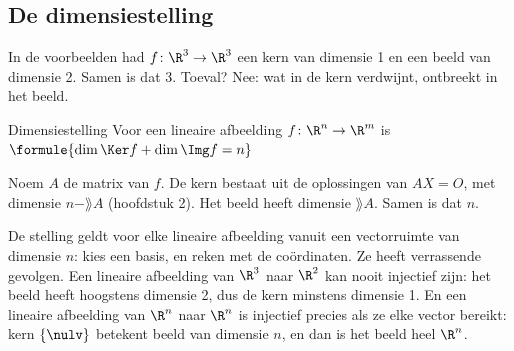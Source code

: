 
\begin{oefeningen}
\end{oefeningen}

\subsection{De dimensiestelling}

In de voorbeelden had $f \colon \R^3 \to \R^3$ een kern van dimensie 1 en een beeld van dimensie 2. Samen is dat 3. Toeval? Nee: wat in de kern verdwijnt, ontbreekt in het beeld.

\begin{theorie}
\begin{stelling}{Dimensiestelling}
Voor een lineaire afbeelding $f \colon \R^n \to \R^m$ is \quad $\formule{\dim \Ker f + \dim \Img f = n}$
\end{stelling}

\begin{bewijs}
Noem $A$ de matrix van $f$. De kern bestaat uit de oplossingen van $AX = O$, met dimensie $n - \rang A$ (hoofdstuk 2). Het beeld heeft dimensie $\rang A$. Samen is dat $n$.
\end{bewijs}
\end{theorie}

De stelling geldt voor elke lineaire afbeelding vanuit een vectorruimte van dimensie $n$: kies een basis, en reken met de coördinaten. Ze heeft verrassende gevolgen. Een lineaire afbeelding van $\R^3$ naar $\R^2$ kan nooit injectief zijn: het beeld heeft hoogstens dimensie 2, dus de kern minstens dimensie 1. En een lineaire afbeelding van $\R^n$ naar $\R^n$ is injectief precies als ze elke vector bereikt: kern $\{\nulv\}$ betekent beeld van dimensie $n$, en dan is het beeld heel $\R^n$.

